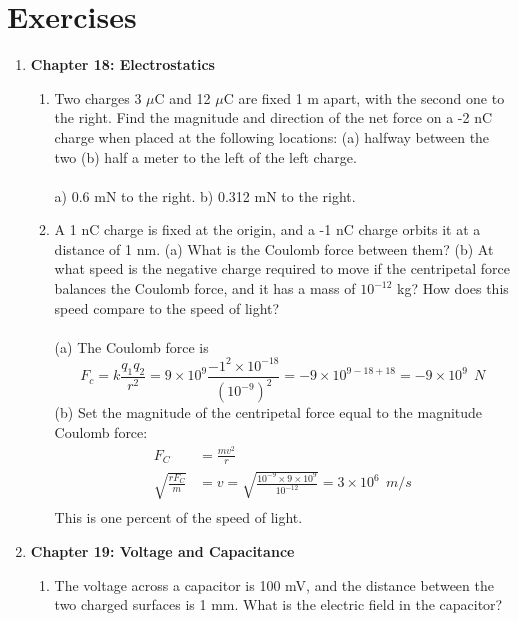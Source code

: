 \documentclass[10pt]{article}
\begin{document}
\clearpage

\section{Exercises}

\begin{enumerate}
\item \textbf{Chapter 18: Electrostatics}
\begin{enumerate}
\item Two charges 3 $\mu$C and 12 $\mu$C are fixed 1 m apart, with the second one to the right. Find the magnitude and direction of the net force on a -2 nC charge when placed at the following locations: (a) halfway between the two (b) half a meter to the left of the left charge. \\ \\
a) 0.6 mN to the right.  b) 0.312 mN to the right. \\
\item A 1 nC charge is fixed at the origin, and a -1 nC charge orbits it at a distance of 1 nm.  (a) What is the Coulomb force between them?  (b) At what speed is the negative charge required to move if the centripetal force balances the Coulomb force, and it has a mass of $10^{-12}$ kg?  How does this speed compare to the speed of light? \\ \\
(a) The Coulomb force is
\begin{equation}
F_c = k\frac{q_1 q_2}{r^2} = 9\times 10^{9} \frac{-1^2 \times 10^{-18}}{(10^{-9})^2} = -9\times 10^{9-18+18}=-9\times 10^{9}~~N
\end{equation}
(b) Set the magnitude of the centripetal force equal to the magnitude Coulomb force:
\begin{align}
F_C &= \frac{m v^2}{r} \\
\sqrt{\frac{r F_C}{m}} &= v = \sqrt{\frac{10^{-9} \times 9 \times 10^{9}}{10^{-12}}} = 3 \times 10^6 ~~ m/s\\
\end{align}
This is one percent of the speed of light. \\
\end{enumerate}
\item \textbf{Chapter 19: Voltage and Capacitance}
\begin{enumerate}
\item The voltage across a capacitor is 100 mV, and the distance between the two charged surfaces is 1 mm.  What is the electric field in the capacitor? \\ \\

\end{enumerate}
\end{enumerate}
\end{document}
